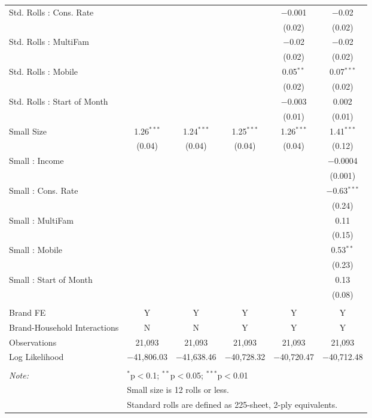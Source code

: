 \begin{table}[!htbp]
\begin{tabular}{@{\extracolsep{5pt}}lccccc}
  Std. Rolls : Cons. Rate &  &  &  & $-$0.001 & $-$0.02 \\ 
  &  &  &  & (0.02) & (0.02) \\ 
  Std. Rolls : MultiFam &  &  &  & $-$0.02 & $-$0.02 \\ 
  &  &  &  & (0.02) & (0.02) \\ 
  Std. Rolls : Mobile &  &  &  & 0.05$^{**}$ & 0.07$^{***}$ \\ 
  &  &  &  & (0.02) & (0.02) \\ 
  Std. Rolls : Start of Month &  &  &  & $-$0.003 & 0.002 \\ 
  &  &  &  & (0.01) & (0.01) \\ 
  Small Size & 1.26$^{***}$ & 1.24$^{***}$ & 1.25$^{***}$ & 1.26$^{***}$ & 1.41$^{***}$ \\ 
  & (0.04) & (0.04) & (0.04) & (0.04) & (0.12) \\ 
  Small : Income &  &  &  &  & $-$0.0004 \\ 
  &  &  &  &  & (0.001) \\ 
  Small : Cons. Rate &  &  &  &  & $-$0.63$^{***}$ \\ 
  &  &  &  &  & (0.24) \\ 
  Small : MultiFam &  &  &  &  & 0.11 \\ 
  &  &  &  &  & (0.15) \\ 
  Small : Mobile &  &  &  &  & 0.53$^{**}$ \\ 
  &  &  &  &  & (0.23) \\ 
  Small : Start of Month &  &  &  &  & 0.13 \\ 
  &  &  &  &  & (0.08) \\ 
 \hline \\[-1.8ex] 
Brand FE & Y & Y & Y & Y & Y \\ 
Brand-Household Interactions & N & N & Y & Y & Y \\ 
Observations & 21,093 & 21,093 & 21,093 & 21,093 & 21,093 \\ 
Log Likelihood & $-$41,806.03 & $-$41,638.46 & $-$40,728.32 & $-$40,720.47 & $-$40,712.48 \\ 
\hline 
\hline \\[-1.8ex] 
\textit{Note:}  & \multicolumn{5}{l}{$^{*}$p$<$0.1; $^{**}$p$<$0.05; $^{***}$p$<$0.01} \\ 
 & \multicolumn{5}{l}{Small size is 12 rolls or less.} \\ 
 & \multicolumn{5}{l}{Standard rolls are defined as 225-sheet, 2-ply equivalents.} \\ 
\end{tabular} 
\end{table} 
